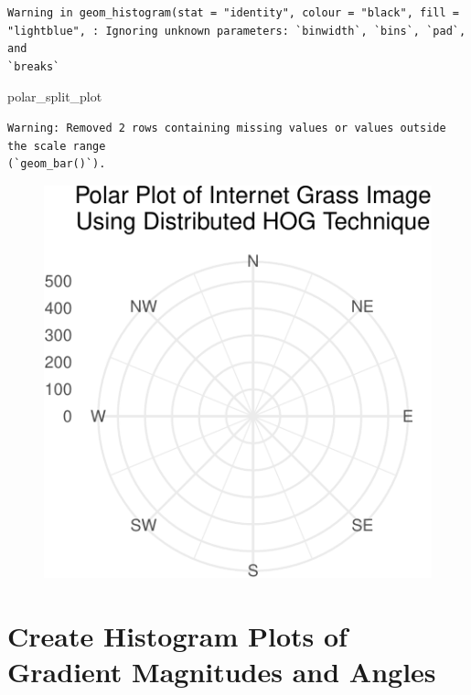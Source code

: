 \documentclass[
  letterpaper,
  DIV=11,
  numbers=noendperiod]{scrreprt}
\newenvironment{Shaded}{\begin{snugshade}}{\end{snugshade}}
\newcommand{\NormalTok}[1]{\textcolor[rgb]{0.00,0.23,0.31}{#1}}
\begin{document}
\begin{verbatim}
Warning in geom_histogram(stat = "identity", colour = "black", fill =
"lightblue", : Ignoring unknown parameters: `binwidth`, `bins`, `pad`, and
`breaks`
\end{verbatim}

\begin{Shaded}
\begin{Highlighting}[]
\NormalTok{polar\_split\_plot}
\end{Highlighting}
\end{Shaded}

\begin{verbatim}
Warning: Removed 2 rows containing missing values or values outside the scale range
(`geom_bar()`).
\end{verbatim}

\begin{figure}[H]

{\centering \includegraphics{results_files/figure-pdf/unnamed-chunk-6-1.pdf}

}

\end{figure}

\hypertarget{create-histogram-plots-of-gradient-magnitudes-and-angles}{%
\section{Create Histogram Plots of Gradient Magnitudes and
Angles}\label{create-histogram-plots-of-gradient-magnitudes-and-angles}}
\end{document}
